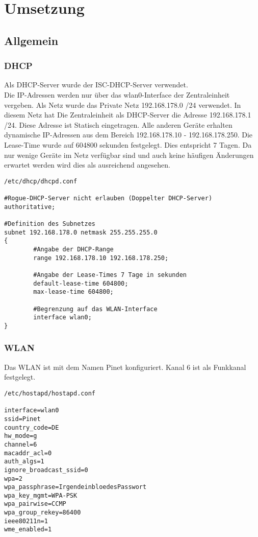 \chapter{Umsetzung}

\section{Allgemein}

\subsection{DHCP}

Als DHCP-Server wurde der ISC-DHCP-Server verwendet.\\
Die IP-Adressen werden nur über das wlan0-Interface der Zentraleinheit vergeben.
Als Netz wurde das Private Netz 192.168.178.0 /24 verwendet. In diesem Netz hat
Die Zentraleinheit als DHCP-Server die Adresse 192.168.178.1 /24. Diese Adresse
ist Statisch eingetragen. Alle anderen Geräte erhalten dynamische IP-Adressen
aus dem Bereich 192.168.178.10 - 192.168.178.250. Die Lease-Time wurde auf
604800 sekunden festgelegt. Dies entspricht 7 Tagen. Da nur wenige Geräte im
Netz verfügbar sind und auch keine häufigen Änderungen erwartet werden wird dies
als ausreichend angesehen.

\begin{verbatim}
/etc/dhcp/dhcpd.conf

#Rogue-DHCP-Server nicht erlauben (Doppelter DHCP-Server)
authoritative;

#Definition des Subnetzes
subnet 192.168.178.0 netmask 255.255.255.0
{
        #Angabe der DHCP-Range
        range 192.168.178.10 192.168.178.250;

        #Angabe der Lease-Times 7 Tage in sekunden
        default-lease-time 604800;
        max-lease-time 604800;

        #Begrenzung auf das WLAN-Interface
        interface wlan0;
}

\end{verbatim}

\subsection{WLAN}

Das WLAN ist mit dem Namen Pinet konfiguriert. Kanal 6 ist als Funkkanal
festgelegt.


\begin{verbatim}
/etc/hostapd/hostapd.conf

interface=wlan0
ssid=Pinet
country_code=DE
hw_mode=g
channel=6
macaddr_acl=0
auth_algs=1
ignore_broadcast_ssid=0
wpa=2
wpa_passphrase=IrgendeinbloedesPasswort
wpa_key_mgmt=WPA-PSK
wpa_pairwise=CCMP
wpa_group_rekey=86400
ieee80211n=1
wme_enabled=1

\end{verbatim}

